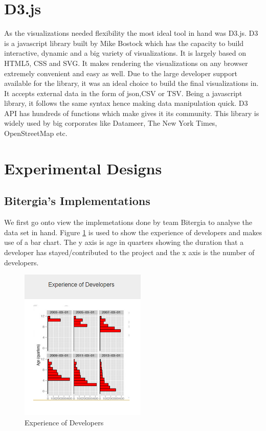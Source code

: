 \documentclass[seploa]{beavtex}
\begin{document}
\section{D3.js}
As the visualizations needed flexibility the most ideal tool in hand was D3.js. D3 is a javascript library built by Mike Bostock which has the capacity to build interactive, dynamic and a big variety of visualizations. It is largely based on HTML5, CSS and SVG. It makes rendering the visualizations on any browser extremely convenient and easy as well. Due to the large developer support available for the library, it was an ideal choice to build the final visualizations in. It accepts external data in the form of json,CSV or TSV. Being a javascript library, it follows the same syntax hence making data manipulation quick. D3 API has hundreds of functions which make gives it its community. This library is widely used by big corporates like Datameer, The New York Times, OpenStreetMap etc.

\section{Experimental Designs}

\subsection{Bitergia's Implementations}
We first go onto view the implemetations done by team Bitergia to analyse the data set in hand. Figure \ref{fig:devExp} is used to show the experience of developers and makes use of a bar chart. The y axis is age in quarters showing the duration that a developer has stayed/contributed to the project and the x axis is the number of developers.

\begin{figure}[H]
\begin{center}
\includegraphics[width=60mm]{image11.PNG}
\end{center}
\caption{Experience of Developers}
\label{fig:devExp}
\end{figure}
\end{document}
